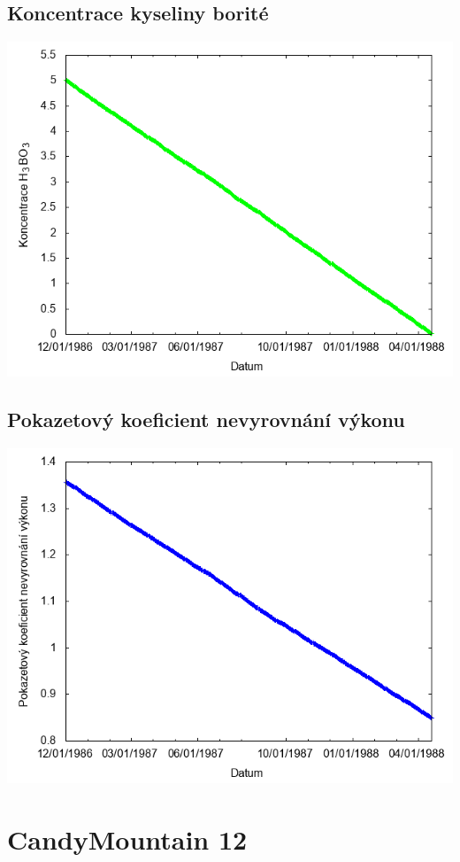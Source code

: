 \documentclass[a4paper,twoside,11pt]{article}
\begin{document}
\subsection*{Koncentrace kyseliny borité}
\begin{center}
\includegraphics[width=.8\textwidth]{graphs/CandyMountain_11_bc.png}
\end{center}

\subsection*{Pokazetový koeficient nevyrovnání výkonu}
\begin{center}
\includegraphics[width=.8\textwidth]{graphs/CandyMountain_11_fha.png}
\end{center}

\newpage
\section*{CandyMountain 12}
\end{document}
